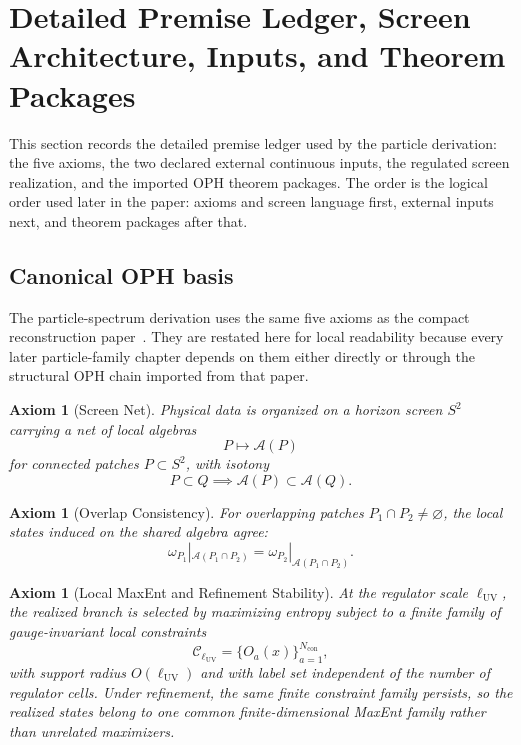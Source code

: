 \documentclass[11pt]{article}
\newtheorem{axiom}[theorem]{Axiom}
\begin{document}
\section{Detailed Premise Ledger, Screen Architecture, Inputs, and Theorem Packages}\label{sec:particle-premise-ledger}

This section records the detailed premise ledger used by the particle derivation: the five axioms,
the two declared external continuous inputs, the regulated screen realization, and the imported
OPH theorem packages. The order is the logical order used later in the paper: axioms and screen
language first, external inputs next, and theorem packages after that.

\subsection{Canonical OPH basis}

The particle-spectrum derivation uses the same five axioms as the compact reconstruction
paper~\cite{ophcompact}. They are restated here for local readability because every later
particle-family chapter depends on them either directly or through the structural OPH chain
imported from that paper.

\begin{axiom}[Screen Net]\label{ax:screen}
Physical data is organized on a horizon screen \(S^2\) carrying a net of local algebras
\[
P \longmapsto \mathcal A(P)
\]
for connected patches \(P\subset S^2\), with isotony
\[
P\subset Q \implies \mathcal A(P)\subset \mathcal A(Q).
\]
\end{axiom}

\begin{axiom}[Overlap Consistency]\label{ax:overlap}
For overlapping patches \(P_1\cap P_2\neq\varnothing\), the local states induced on the shared
algebra agree:
\[
\omega_{P_1}|_{\mathcal A(P_1\cap P_2)}
=
\omega_{P_2}|_{\mathcal A(P_1\cap P_2)}.
\]
\end{axiom}

\begin{axiom}[Local MaxEnt and Refinement Stability]\label{ax:maxent}
At the regulator scale \(\ell_{\mathrm{UV}}\), the realized branch is selected by maximizing
entropy subject to a finite family of gauge-invariant local constraints
\[
\mathcal C_{\ell_{\mathrm{UV}}}=\{O_a(x)\}_{a=1}^{N_{\mathrm{con}}},
\]
with support radius \(O(\ell_{\mathrm{UV}})\) and with label set independent of the number of
regulator cells. Under refinement, the same finite constraint family persists, so the realized
states belong to one common finite-dimensional MaxEnt family rather than unrelated maximizers.
\end{axiom}
\end{document}

